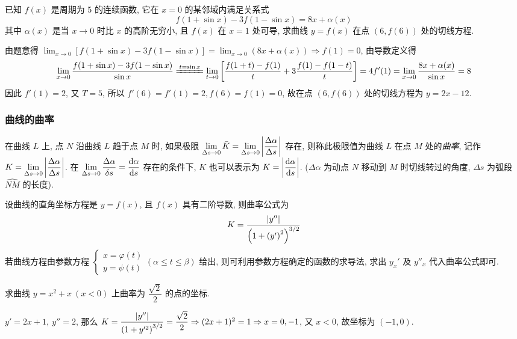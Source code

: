 \begin{example}
    已知 $f(x)$ 是周期为 5 的连续函数, 它在 $x=0$ 的某邻域内满足关系式 $$
    f(1+\sin x)-3f(1-\sin x)=8x+\alpha(x)
    $$
    其中 $\alpha(x)$ 是当 $x\to 0$ 时比 $x$ 的高阶无穷小, 且 $f(x)$ 在 $x=1$ 处可导, 求曲线 $y=f(x)$ 在点 $(6,f(6))$ 处的切线方程.
\end{example}
\begin{solution}
    由题意得 $\displaystyle \lim_{x \to 0}[f(1+\sin x)-3f(1-\sin x)]=\lim_{x \to 0}(8x+\alpha(x))\Rightarrow f(1)=0$, 由导数定义得 
    $$
    \lim_{x \to 0}\dfrac{f(1+\sin x)-3f(1-\sin x)}{\sin x}\xlongequal{t=\sin x}\lim_{t \to 0}\qty[\dfrac{f(1+t)-f(1)}{t}+3\dfrac{f(1)-f(1-t)}{t}]=4f'(1)=\lim_{x \to 0}\dfrac{8x+\alpha(x)}{\sin x}=8
    $$
    因此 $f'(1)=2$, 又 $T=5$, 所以 $f'(6)=f'(1)=2,f(6)=f(1)=0$, 故在点 $(6,f(6))$ 处的切线方程为 $y=2x-12.$
\end{solution}

\subsubsection{曲线的曲率}

\begin{definition}[曲率]
    在曲线 $L$ 上, 点 $N$ 沿曲线 $L$ 趋于点 $M$ 时, 如果极限 $\displaystyle\lim_{\Delta s\to0}\bar{K}=\lim_{\Delta s\to0}\qty|\dfrac{\Delta\alpha}{\Delta s}|$ 存在, 则称此极限值为曲线 $L$ 在点 $M$ 处的\textit{曲率}, 记作 $K=\displaystyle\lim_{\Delta s\to0}\qty|\dfrac{\Delta\alpha}{\Delta s}|$.
    在 $\displaystyle\lim_{\Delta s\to0}\dfrac{\Delta\alpha}{\delta s}=\dv{\alpha}{s}$ 存在的条件下, $K$ 也可以表示为 $K=\qty|\dfrac{\dd \alpha}{\dd s}|$. ($\Delta \alpha$ 为动点 $N$ 移动到 $M$ 时切线转过的角度, $\Delta s$ 为弧段 $\widehat{NM} $ 的长度).
\end{definition}

\begin{theorem}[曲率的计算公式]
    设曲线的直角坐标方程是 $y=f(x)$, 且 $f(x)$ 具有二阶导数, 则曲率公式为 $$K=\dfrac{|y''|}{\qty(1+\qty(y')^2)^{3/2}}$$
    若曲线方程由参数方程 $\begin{cases}
            x=\varphi(t) \\y=\psi(t)
        \end{cases}(\alpha \leqslant t\leqslant \beta)$ 给出, 则可利用参数方程确定的函数的求导法, 求出 $y_x'$ 及 $y''_x$ 代入曲率公式即可.
\end{theorem}

\begin{example}[2012 数二]
    求曲线 $y=x^2+x~(x<0)$ 上曲率为 $\dfrac{\sqrt{2}}{2}$ 的点的坐标.
\end{example}
\begin{solution}
    $y'=2x+1,~y''=2$, 那么 $K=\dfrac{|y''|}{\qty(1+y'^2)^{3/2}}=\dfrac{\sqrt{2}}{2}\Rightarrow (2x+1)^2=1\Rightarrow x=0,-1$, 又 $x<0$, 故坐标为 $(-1,0).$
\end{solution}

